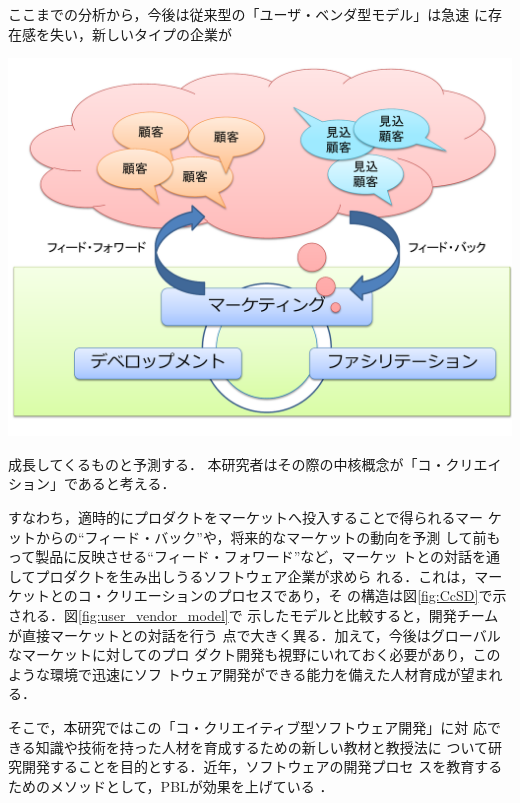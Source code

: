 \documentclass[a4j,9pt,twoside]{jarticle}
\begin{document}
\begin{multicols}{2}
    ここまでの分析から，今後は従来型の「ユーザ・ベンダ型モデル」は急速
    に存在感を失い，新しいタイプの企業が
\begin{center}
\includegraphics[width=0.8\linewidth]{figs/CcSD.pdf}
\label{fig:CcSD}
\end{center}
    成長してくるものと予測する．
    本研究者はその際の中核概念が「コ・クリエイション」であると考える．
    
    すなわち，適時的にプロダクトをマーケットへ投入することで得られるマー
    ケットからの``フィード・バック''や，将来的なマーケットの動向を予測
    して前もって製品に反映させる``フィード・フォワード''など，マーケッ
    トとの対話を通してプロダクトを生み出しうるソフトウェア企業が求めら
    れる．これは，マーケットとのコ・クリエーションのプロセスであり，そ
    の構造は図\ref{fig:CcSD}で示される．図\ref{fig:user_vendor_model}で
    示したモデルと比較すると，開発チームが直接マーケットとの対話を行う
    点で大きく異る．加えて，今後はグローバルなマーケットに対してのプロ
    ダクト開発も視野にいれておく必要があり，このような環境で迅速にソフ
    トウェア開発ができる能力を備えた人材育成が望まれる．
    
    そこで，本研究ではこの「コ・クリエイティブ型ソフトウェア開発」に対
    応できる知識や技術を持った人材を育成するための新しい教材と教授法に
    ついて研究開発することを目的とする．近年，ソフトウェアの開発プロセ
    スを教育するためのメソッドとして，PBLが効果を上げている
    \cite{pub:matsuzawa-2008}．


\end{multicols}
\end{document}
